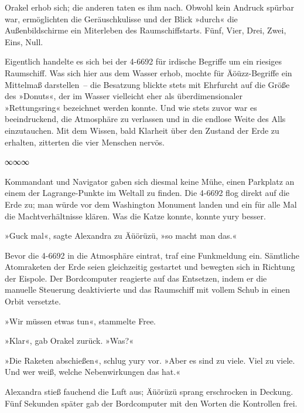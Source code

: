 
Orakel erhob sich; die anderen taten es ihm nach. Obwohl kein Andruck spürbar war, ermöglichten die Geräuschkulisse und der Blick »durch« die Außenbildschirme ein Miterleben des Raumschiffstarts. Fünf, Vier, Drei, Zwei, Eins, Null.

Eigentlich handelte es sich bei der 4-6692 für irdische Begriffe um ein riesiges Raumschiff. Was sich hier aus dem Wasser erhob, mochte für Äöüzz-Begriffe ein Mittelmaß darstellen~– die Besatzung blickte stets mit Ehrfurcht auf die Größe des »Donuts«, der im Wasser vielleicht eher als überdimensionaler »Rettungsring« bezeichnet werden konnte. Und wie stets zuvor war es beeindruckend, die Atmosphäre zu verlassen und in die endlose Weite des Alls einzutauchen. Mit dem Wissen, bald Klarheit über den Zustand der Erde zu erhalten, zitterten die vier Menschen nervös.

\begin{center}
∞∞∞
\end{center}

Kommandant und Navigator gaben sich diesmal keine Mühe, einen Parkplatz an einem der Lagrange-Punkte im Weltall zu finden. Die 4-6692 flog direkt auf die Erde zu; man würde vor dem Washington Monument landen und ein für alle Mal die Machtverhältnisse klären. Was die Katze konnte, konnte yury besser.

»Guck mal«, sagte Alexandra zu Äüörüzü, »so macht man das.«

Bevor die 4-6692 in die Atmosphäre eintrat, traf eine Funkmeldung ein. Sämtliche Atomraketen der Erde seien gleichzeitig gestartet und bewegten sich in Richtung der Eispole. Der Bordcomputer reagierte auf das Entsetzen, indem er die manuelle Steuerung deaktivierte und das Raumschiff mit vollem Schub in einen Orbit versetzte.

»Wir müssen etwas tun«, stammelte Free.

»Klar«, gab Orakel zurück. »Was?«

»Die Raketen abschießen«, schlug yury vor. »Aber es sind zu viele. Viel zu viele. Und wer weiß, welche Nebenwirkungen das hat.«

Alexandra stieß fauchend die Luft aus; Äüörüzü sprang erschrocken in Deckung. Fünf Sekunden später gab der Bordcomputer mit den Worten  die Kontrollen frei.

